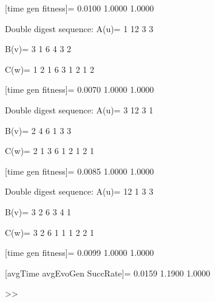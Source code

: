 [time gen fitness]=
    0.0100    1.0000    1.0000

Double digest sequence:
A(u)=
     1    12     3     3

B(v)=
     3     1     6     4     3     2

C(w)=
     1     2     1     6     3     1     2     1     2

[time gen fitness]=
    0.0070    1.0000    1.0000

Double digest sequence:
A(u)=
     3    12     3     1

B(v)=
     2     4     6     1     3     3

C(w)=
     2     1     3     6     1     2     1     2     1

[time gen fitness]=
    0.0085    1.0000    1.0000

Double digest sequence:
A(u)=
    12     1     3     3

B(v)=
     3     2     6     3     4     1

C(w)=
     3     2     6     1     1     1     2     2     1

[time gen fitness]=
    0.0099    1.0000    1.0000

[avgTime  avgEvoGen  SuccRate]=
    0.0159    1.1900    1.0000

>> 